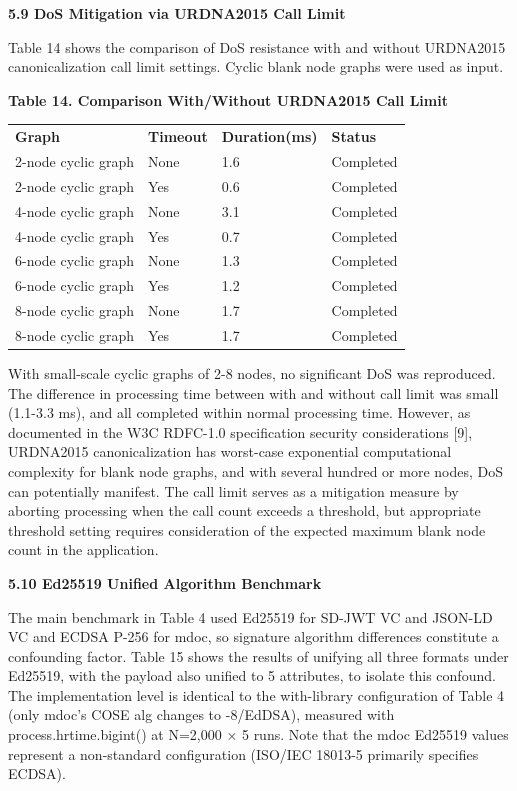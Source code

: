 \textbf{5.9 DoS Mitigation via URDNA2015 Call Limit}

Table 14 shows the comparison of DoS resistance with and without URDNA2015 canonicalization call limit settings. Cyclic blank node graphs were used as input.

\textbf{Table 14. Comparison With/Without URDNA2015 Call Limit}

\begin{longtable}[]{@{}llll@{}}
\toprule
\endhead
\textbf{Graph} & \textbf{Timeout} & \textbf{Duration(ms)} & \textbf{Status}\tabularnewline
2-node cyclic graph & None & 1.6 & Completed\tabularnewline
2-node cyclic graph & Yes & 0.6 & Completed\tabularnewline
4-node cyclic graph & None & 3.1 & Completed\tabularnewline
4-node cyclic graph & Yes & 0.7 & Completed\tabularnewline
6-node cyclic graph & None & 1.3 & Completed\tabularnewline
6-node cyclic graph & Yes & 1.2 & Completed\tabularnewline
8-node cyclic graph & None & 1.7 & Completed\tabularnewline
8-node cyclic graph & Yes & 1.7 & Completed\tabularnewline
\bottomrule
\end{longtable}

With small-scale cyclic graphs of 2-8 nodes, no significant DoS was reproduced. The difference in processing time between with and without call limit was small (1.1-3.3 ms), and all completed within normal processing time. However, as documented in the W3C RDFC-1.0 specification security considerations {[}9{]}, URDNA2015 canonicalization has worst-case exponential computational complexity for blank node graphs, and with several hundred or more nodes, DoS can potentially manifest. The call limit serves as a mitigation measure by aborting processing when the call count exceeds a threshold, but appropriate threshold setting requires consideration of the expected maximum blank node count in the application.

\textbf{5.10 Ed25519 Unified Algorithm Benchmark}

The main benchmark in Table 4 used Ed25519 for SD-JWT VC and JSON-LD VC and ECDSA P-256 for mdoc, so signature algorithm differences constitute a confounding factor. Table 15 shows the results of unifying all three formats under Ed25519, with the payload also unified to 5 attributes, to isolate this confound. The implementation level is identical to the with-library configuration of Table 4 (only mdoc's COSE alg changes to -8/EdDSA), measured with process.hrtime.bigint() at N=2,000 × 5 runs. Note that the mdoc Ed25519 values represent a non-standard configuration (ISO/IEC 18013-5 primarily specifies ECDSA).


